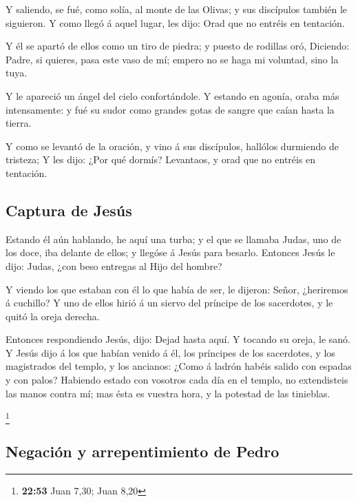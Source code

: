  Y saliendo, se fué, como solía, al monte de las Olivas;
y sus discípulos también le siguieron.  Y como llegó á
aquel lugar, les dijo: Orad que no entréis en tentación.

 Y él se apartó de ellos como un tiro de piedra; y puesto
de rodillas oró,  Diciendo: Padre, si quieres, pasa este
vaso de mí; empero no se haga mi voluntad, sino la tuya.

 Y le apareció un ángel del cielo confortándole.
 Y estando en agonía, oraba más intensamente: y fué su
sudor como grandes gotas de sangre que caían hasta la tierra.

 Y como se levantó de la oración, y vino á sus
discípulos, hallólos durmiendo de tristeza;  Y les dijo:
¿Por qué dormís? Levantaos, y orad que no entréis en tentación.

\hypertarget{captura-de-jesuxfas}{%
\subsection{Captura de Jesús}\label{captura-de-jesuxfas}}

 Estando él aún hablando, he aquí una turba; y el que se
llamaba Judas, uno de los doce, iba delante de ellos; y llegóse á Jesús
para besarlo.  Entonces Jesús le dijo: Judas, ¿con beso
entregas al Hijo del hombre?

 Y viendo los que estaban con él lo que había de ser, le
dijeron: Señor, ¿heriremos á cuchillo?  Y uno de ellos
hirió á un siervo del príncipe de los sacerdotes, y le quitó la oreja
derecha.

 Entonces respondiendo Jesús, dijo: Dejad hasta aquí. Y
tocando su oreja, le sanó.  Y Jesús dijo á los que habían
venido á él, los príncipes de los sacerdotes, y los magistrados del
templo, y los ancianos: ¿Como á ladrón habéis salido con espadas y con
palos?  Habiendo estado con vosotros cada día en el
templo, no extendisteis las manos contra mí; mas ésta es vuestra hora, y
la potestad de las tinieblas.

\footnote{\textbf{22:53} Juan 7,30; Juan 8,20}

\hypertarget{negaciuxf3n-y-arrepentimiento-de-pedro}{%
\subsection{Negación y arrepentimiento de
Pedro}\label{negaciuxf3n-y-arrepentimiento-de-pedro}}

